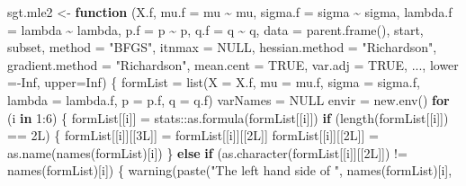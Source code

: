 \documentclass[a4paper, twoside]{templates/ociamthesis}
\newenvironment{Shaded}{\begin{snugshade}}{\end{snugshade}}
\newcommand{\AttributeTok}[1]{\textcolor[rgb]{0.77,0.63,0.00}{#1}}
\newcommand{\ConstantTok}[1]{\textcolor[rgb]{0.00,0.00,0.00}{#1}}
\newcommand{\ControlFlowTok}[1]{\textcolor[rgb]{0.13,0.29,0.53}{\textbf{#1}}}
\newcommand{\DecValTok}[1]{\textcolor[rgb]{0.00,0.00,0.81}{#1}}
\newcommand{\FunctionTok}[1]{\textcolor[rgb]{0.00,0.00,0.00}{#1}}
\newcommand{\NormalTok}[1]{#1}
\newcommand{\OtherTok}[1]{\textcolor[rgb]{0.56,0.35,0.01}{#1}}
\newcommand{\SpecialCharTok}[1]{\textcolor[rgb]{0.00,0.00,0.00}{#1}}
\newcommand{\StringTok}[1]{\textcolor[rgb]{0.31,0.60,0.02}{#1}}
\renewenvironment{Shaded}
{
  \vspace{10pt}%
  \begin{snugshade}%
}{%
  \end{snugshade}%
  \vspace{8pt}%
}
\begin{document}
\begin{Shaded}
\begin{Highlighting}[]
\NormalTok{sgt.mle2 }\OtherTok{\textless{}{-}} \ControlFlowTok{function}\NormalTok{ (X.f, }\AttributeTok{mu.f =}\NormalTok{ mu }\SpecialCharTok{\textasciitilde{}}\NormalTok{ mu, }\AttributeTok{sigma.f =}\NormalTok{ sigma }\SpecialCharTok{\textasciitilde{}}\NormalTok{ sigma, }\AttributeTok{lambda.f =}\NormalTok{ lambda }\SpecialCharTok{\textasciitilde{}} 
\NormalTok{            lambda, }\AttributeTok{p.f =}\NormalTok{ p }\SpecialCharTok{\textasciitilde{}}\NormalTok{ p, }\AttributeTok{q.f =}\NormalTok{ q }\SpecialCharTok{\textasciitilde{}}\NormalTok{ q, }\AttributeTok{data =} \FunctionTok{parent.frame}\NormalTok{(), }
\NormalTok{          start, subset, }\AttributeTok{method =} \StringTok{"BFGS"}\NormalTok{, }\AttributeTok{itnmax =} \ConstantTok{NULL}\NormalTok{, }
          \AttributeTok{hessian.method =} \StringTok{"Richardson"}\NormalTok{, }\AttributeTok{gradient.method =} \StringTok{"Richardson"}\NormalTok{, }
          \AttributeTok{mean.cent =} \ConstantTok{TRUE}\NormalTok{, }\AttributeTok{var.adj =} \ConstantTok{TRUE}\NormalTok{, ..., }\AttributeTok{lower =}\SpecialCharTok{{-}}\ConstantTok{Inf}\NormalTok{, }\AttributeTok{upper=}\ConstantTok{Inf}\NormalTok{) \{}
\NormalTok{  formList }\OtherTok{=} \FunctionTok{list}\NormalTok{(}\AttributeTok{X =}\NormalTok{ X.f, }\AttributeTok{mu =}\NormalTok{ mu.f, }\AttributeTok{sigma =}\NormalTok{ sigma.f, }\AttributeTok{lambda =}\NormalTok{ lambda.f, }
                  \AttributeTok{p =}\NormalTok{ p.f, }\AttributeTok{q =}\NormalTok{ q.f)}
\NormalTok{  varNames }\OtherTok{=} \ConstantTok{NULL}
\NormalTok{  envir }\OtherTok{=} \FunctionTok{new.env}\NormalTok{()}
  \ControlFlowTok{for}\NormalTok{ (i }\ControlFlowTok{in} \DecValTok{1}\SpecialCharTok{:}\DecValTok{6}\NormalTok{) \{}
\NormalTok{    formList[[i]] }\OtherTok{=}\NormalTok{ stats}\SpecialCharTok{::}\FunctionTok{as.formula}\NormalTok{(formList[[i]])}
    \ControlFlowTok{if}\NormalTok{ (}\FunctionTok{length}\NormalTok{(formList[[i]]) }\SpecialCharTok{==}\NormalTok{ 2L) \{}
\NormalTok{      formList[[i]][[3L]] }\OtherTok{=}\NormalTok{ formList[[i]][[2L]]}
\NormalTok{      formList[[i]][[2L]] }\OtherTok{=} \FunctionTok{as.name}\NormalTok{(}\FunctionTok{names}\NormalTok{(formList)[i])}
\NormalTok{    \}}
    \ControlFlowTok{else} \ControlFlowTok{if}\NormalTok{ (}\FunctionTok{as.character}\NormalTok{(formList[[i]][[2L]]) }\SpecialCharTok{!=} \FunctionTok{names}\NormalTok{(formList)[i]) \{}
      \FunctionTok{warning}\NormalTok{(}\FunctionTok{paste}\NormalTok{(}\StringTok{"The left hand side of "}\NormalTok{, }\FunctionTok{names}\NormalTok{(formList)[i], }

\end{Highlighting}
\end{Shaded}
\end{document}
